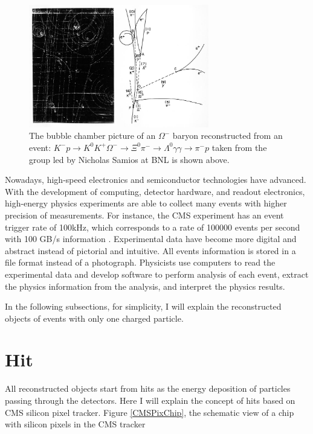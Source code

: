 \begin{figure}[hbtp]
\begin{center}
\includegraphics[width=0.70\textwidth]{Figures/Chapter4/Omega.jpg}
\caption{The bubble chamber picture of an $\Omega^-$ baryon reconstructed from an event: $K^- p \rightarrow K^0 K^+ \Omega^- \rightarrow \Xi^0 \pi^- \rightarrow \Lambda^0 \gamma \gamma \rightarrow \pi^- p$ taken from the group led by Nicholas Samios at BNL is shown above.}
\label{OmegaNick}
\end{center}
\end{figure} 


Nowadays, high-speed electronics and semiconductor technologies have advanced. With the development of computing, detector hardware, and readout electronics, high-energy physics experiments are able to collect many events with higher precision of measurements. For instance, the CMS experiment has an event trigger rate of 100kHz, which corresponds to a rate of 100000 events per second with 100 GB/s information \cite{CMSDAQ}. Experimental data have become more digital and abstract instead of pictorial and intuitive. All events information is stored in a file format instead of a photograph. Physicists use computers to read the experimental data and develop software to perform analysis of each event, extract the physics information from the analysis, and interpret the physics results. 

In the following subsections, for simplicity, I will explain the reconstructed objects of events with only one charged particle. 

\section{Hit}

All reconstructed objects start from hits as the energy deposition of particles passing through the detectors. Here I will explain the concept of hits based on CMS silicon pixel tracker. Figure \ref{CMSPixChip}, the schematic view of a chip with silicon pixels in the CMS tracker


